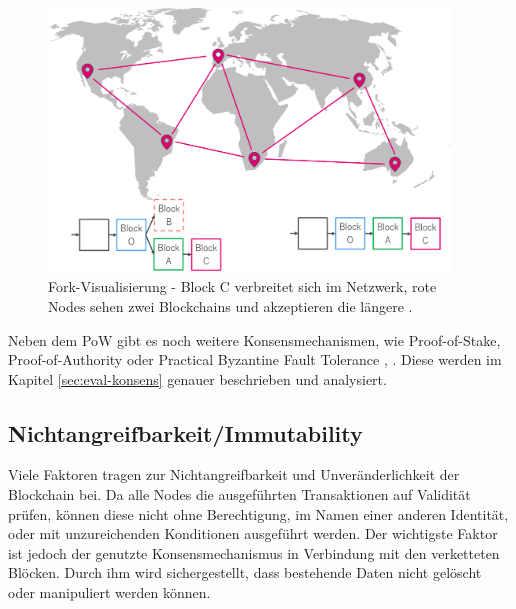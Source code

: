 \begin{figure}[htb]
  \centering
	\includegraphics[width=0.95\textwidth,angle=0]{images/fork_4}
 	\caption{Fork-Visualisierung - Block C verbreitet sich im Netzwerk, rote Nodes sehen zwei Blockchains und akzeptieren die längere \cite{AntonopoulosMasteringbitcoin2015}.}
	\label{fig:fork_4}
\end{figure}

Neben dem PoW gibt es noch weitere Konsensmechanismen, wie Proof-of-Stake, Proof-of-Authority oder Practical Byzantine Fault Tolerance \cite{SukhwaniPerformanceModelingPBFT2017a}, \cite{DeAngelisPBFTvsproofofauthority2017} . Diese werden im Kapitel \ref{sec:eval-konsens} genauer beschrieben und analysiert.


\label{subsec:immutability}
\subsection{Nichtangreifbarkeit/Immutability}
Viele Faktoren tragen zur Nichtangreifbarkeit und Unveränderlichkeit der Blockchain bei. Da alle Nodes die ausgeführten Transaktionen auf Validität prüfen, können diese nicht ohne Berechtigung, im Namen einer anderen Identität, oder mit unzureichenden Konditionen ausgeführt werden. Der wichtigste Faktor ist jedoch der genutzte Konsensmechanismus in Verbindung mit den verketteten Blöcken. Durch ihm wird sichergestellt, dass bestehende Daten nicht gelöscht oder manipuliert werden können.

